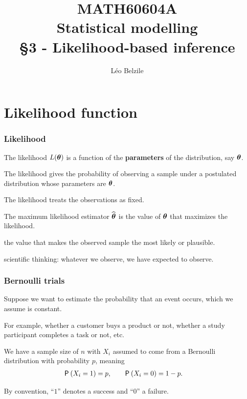 \documentclass{beamer}
\title[\color{white}{MATH60604A Likelihood-based inference}]{\texorpdfstring{MATH60604A \\Statistical modelling \\ \S 3 - Likelihood-based inference}{MATH60604A \\Statistical modelling \\ \S~3 - Likelihood-based inference}}
\author{Léo Belzile}
\institute{HEC Montréal\\
Department of Decision Sciences}
\date{}
\begin{document}
\frame{\titlepage}
% 
% 
% 
% 
\section{Likelihood function}
\begin{frame}
\frametitle{Likelihood}
\bi

\item The \alert{likelihood} $L(\bs{\theta})$ is a function of the \textbf{parameters} of the distribution, say $\bs{\theta}$.

\bi \item The likelihood  gives the probability of observing a sample under a postulated distribution whose parameters are $\bs{\theta}$.
\item The likelihood treats the observations as fixed.
\ei

\item The \alert{maximum likelihood} estimator $\hat{\bs{\theta}}$ is the value of $\bs{\theta}$ that maximizes the likelihood.
\bi \item the value that makes the observed sample the most \alert{likely} or \alert{plausible}. 
\item scientific thinking: whatever we observe, we have expected to observe.
\ei
\ei
\end{frame}
\begin{frame}
\frametitle{Bernoulli trials}
\bi
\item Suppose we want to estimate the probability that an event occurs, which we assume is constant.
\item For example, whether a customer buys a product or not, whether a study participant completes a task or not, etc.
\item We have a sample size of $n$ with $X_i$ assumed to come from a Bernoulli distribution with probability $p$, meaning 
\begin{align*}
\P{X_i=1}&=p, \qquad \P{X_i=0}=1-p.                                 
\end{align*}

\item By convention, ``$1$'' denotes a success and ``$0$'' a failure.
\ei
\end{frame}
\end{document}
